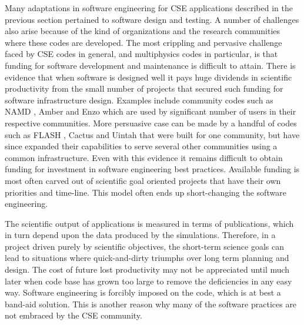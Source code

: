 
\label{sec:institutional-challenges}
Many adaptations in software engineering for CSE applications
described in the previous section pertained to software design and
testing. A number of challenges also arise because of the kind of
organizations and the research communities where these codes are
developed. The most crippling and pervasive 
challenge faced by CSE codes in general, and multiphysics codes in
particular, is that funding for software development and maintenance is difficult to attain. 
There is evidence that when software is designed well
it pays huge dividends in scientific productivity from the
small number of projects that secured such funding for software
infrastructure design. Examples include community codes such as NAMD
\cite{phillips2005scalable}, Amber \cite{case2014amber} and Enzo \cite{Enzo2013} which are used by
significant number of users in their respective communities. More
persuasive case can be made by a handful of codes such as FLASH \cite{Dubey2009, Dubey2008},
Cactus \cite{blazewiczphysics} and Uintah \cite{uintah2,TGRID10} that were built for one community,
but have since expanded their capabilities to serve several other
communities using a common infrastructure.
Even with this evidence it remains difficult to obtain
funding for investment in software engineering best practices.
Available funding is most often carved out of scientific goal 
oriented projects that have their own priorities and time-line. This
model often ends up short-changing the software engineering.


The scientific output of applications is measured in terms of publications, which in
turn depend upon the data produced by the simulations. Therefore, in a
project driven purely by scientific objectives, the short-term science
goals can lead to situations where quick-and-dirty triumphs over
long term planning and design.
The cost of future lost productivity may not be appreciated until much
later when code base has  grown too large to remove the deficiencies
in any easy way.  Software engineering is forcibly imposed on the
code, which is at best a band-aid solution. This is another reason why
many of the software practices are not embraced by the CSE community.  

